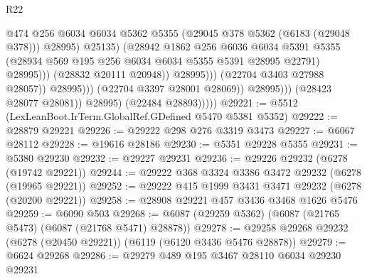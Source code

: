 \begin{lexlean}{R22}
\begin{coremodule}
                                                @474
                                                @256
                                                @6034
                                                @6034
                                                @5362
                                                @5355
                                                (@29045 @378 @5362 (@6183 (@29048 @378)))
                                                @28995)
                                              @25135)
                                            (@28942
                                              @1862
                                              @256
                                              @6036
                                              @6034
                                              @5391
                                              @5355
                                              (@28934
                                                @569
                                                @195
                                                @256
                                                @6034
                                                @6034
                                                @5355
                                                @5391
                                                @28995
                                                @22791)
                                              @28995)))
                                        (@28832 @20111 @20948))
                                      @28995)))
                                (@22704 @3403 @27988 @28057))
                              @28995)))
                        (@22704 @3397 @28001 @28069))
                      @28995)))
                (@28423 @28077 @28081))
              @28995)
            (@22484 @28893)))))
@29221 := @5512 (LexLeanBoot.IrTerm.GlobalRef.GDefined @5470 @5381 @5352)
@29222 := @28879 @29221
@29226 := @29222 @298 @276 @3319 @3473
@29227 := @6067 @28112
@29228 := @19616 @28186
@29230 := @5351 @29228 @5355
@29231 := @5380 @29230
@29232 := @29227 @29231
@29236 := @29226 @29232 (@6278 (@19742 @29221))
@29244 := @29222 @368 @3324 @3386 @3472 @29232 (@6278 (@19965 @29221))
@29252 := @29222 @415 @1999 @3431 @3471 @29232 (@6278 (@20200 @29221))
@29258 := @28908 @29221 @457 @3436 @3468 @1626 @5476
@29259 := @6090 @503
@29268 := @6087 (@29259 @5362) (@6087 (@21765 @5473) (@6087 (@21768 @5471) @28878))
@29278 := @29258 @29268 @29232 (@6278 (@20450 @29221)) (@6119 (@6120 @3436 @5476 @28878))
@29279 := @6624 @29268
@29286 := @29279 @489 @195 @3467 @28110 @6034 @29230 @29231

\end{coremodule}
\end{lexlean}

